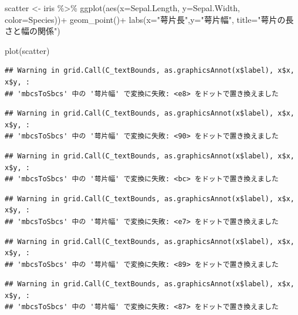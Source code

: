 \documentclass[
]{book}
\newenvironment{Shaded}{\begin{snugshade}}{\end{snugshade}}
\newcommand{\AttributeTok}[1]{\textcolor[rgb]{0.77,0.63,0.00}{#1}}
\newcommand{\FunctionTok}[1]{\textcolor[rgb]{0.00,0.00,0.00}{#1}}
\newcommand{\NormalTok}[1]{#1}
\newcommand{\OtherTok}[1]{\textcolor[rgb]{0.56,0.35,0.01}{#1}}
\newcommand{\SpecialCharTok}[1]{\textcolor[rgb]{0.00,0.00,0.00}{#1}}
\newcommand{\StringTok}[1]{\textcolor[rgb]{0.31,0.60,0.02}{#1}}
\begin{document}
\begin{Shaded}
\begin{Highlighting}[]
\NormalTok{scatter }\OtherTok{\textless{}{-}}\NormalTok{ iris }\SpecialCharTok{\%\textgreater{}\%} 
  \FunctionTok{ggplot}\NormalTok{(}\FunctionTok{aes}\NormalTok{(}\AttributeTok{x=}\NormalTok{Sepal.Length, }\AttributeTok{y=}\NormalTok{Sepal.Width, }\AttributeTok{color=}\NormalTok{Species))}\SpecialCharTok{+}
  \FunctionTok{geom\_point}\NormalTok{()}\SpecialCharTok{+}
  \FunctionTok{labs}\NormalTok{(}\AttributeTok{x=}\StringTok{"萼片長"}\NormalTok{,}\AttributeTok{y=}\StringTok{"萼片幅"}\NormalTok{, }\AttributeTok{title=}\StringTok{"萼片の長さと幅の関係"}\NormalTok{)}

\FunctionTok{plot}\NormalTok{(scatter)}
\end{Highlighting}
\end{Shaded}

\begin{verbatim}
## Warning in grid.Call(C_textBounds, as.graphicsAnnot(x$label), x$x, x$y, :
## 'mbcsToSbcs' 中の '萼片幅' で変換に失敗: <e8> をドットで置き換えました
\end{verbatim}

\begin{verbatim}
## Warning in grid.Call(C_textBounds, as.graphicsAnnot(x$label), x$x, x$y, :
## 'mbcsToSbcs' 中の '萼片幅' で変換に失敗: <90> をドットで置き換えました
\end{verbatim}

\begin{verbatim}
## Warning in grid.Call(C_textBounds, as.graphicsAnnot(x$label), x$x, x$y, :
## 'mbcsToSbcs' 中の '萼片幅' で変換に失敗: <bc> をドットで置き換えました
\end{verbatim}

\begin{verbatim}
## Warning in grid.Call(C_textBounds, as.graphicsAnnot(x$label), x$x, x$y, :
## 'mbcsToSbcs' 中の '萼片幅' で変換に失敗: <e7> をドットで置き換えました
\end{verbatim}

\begin{verbatim}
## Warning in grid.Call(C_textBounds, as.graphicsAnnot(x$label), x$x, x$y, :
## 'mbcsToSbcs' 中の '萼片幅' で変換に失敗: <89> をドットで置き換えました
\end{verbatim}

\begin{verbatim}
## Warning in grid.Call(C_textBounds, as.graphicsAnnot(x$label), x$x, x$y, :
## 'mbcsToSbcs' 中の '萼片幅' で変換に失敗: <87> をドットで置き換えました
\end{verbatim}
\end{document}

